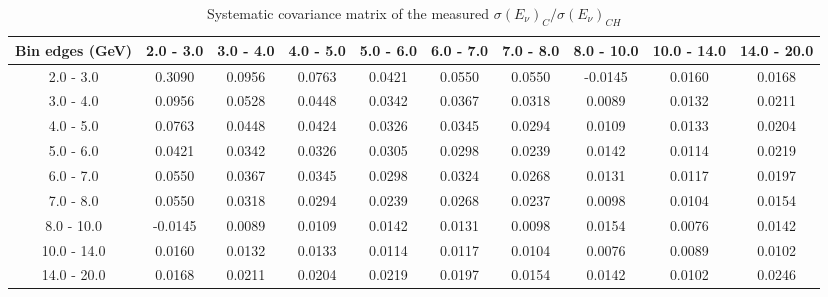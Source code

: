 \documentclass[aps,prl,twocolumn,superscriptaddress,nofootinbib]{revtex4-1}
\begin{document}
\begin{table}[h!]
  \centering
  \caption{Systematic covariance matrix of the measured $\sigma(E_{\nu})_{C}/\sigma(E_{\nu})_{CH}$}
    \begin{tabular}{c||ccccccccc}
      Bin edges (GeV) & 2.0 - 3.0 & 3.0 - 4.0 & 4.0 - 5.0 & 5.0 - 6.0 & 6.0 - 7.0 & 7.0 - 8.0 & 8.0 - 10.0 & 10.0 - 14.0 & 14.0 - 20.0 \\
\hline \hline
        2.0 - 3.0 &  0.3090 &  0.0956 &  0.0763 &  0.0421 &  0.0550 &  0.0550 & -0.0145 &  0.0160 &  0.0168 \\
        3.0 - 4.0 &  0.0956 &  0.0528 &  0.0448 &  0.0342 &  0.0367 &  0.0318 &  0.0089 &  0.0132 &  0.0211 \\
        4.0 - 5.0 &  0.0763 &  0.0448 &  0.0424 &  0.0326 &  0.0345 &  0.0294 &  0.0109 &  0.0133 &  0.0204 \\
        5.0 - 6.0 &  0.0421 &  0.0342 &  0.0326 &  0.0305 &  0.0298 &  0.0239 &  0.0142 &  0.0114 &  0.0219 \\
        6.0 - 7.0 &  0.0550 &  0.0367 &  0.0345 &  0.0298 &  0.0324 &  0.0268 &  0.0131 &  0.0117 &  0.0197 \\
        7.0 - 8.0 &  0.0550 &  0.0318 &  0.0294 &  0.0239 &  0.0268 &  0.0237 &  0.0098 &  0.0104 &  0.0154 \\
       8.0 - 10.0 & -0.0145 &  0.0089 &  0.0109 &  0.0142 &  0.0131 &  0.0098 &  0.0154 &  0.0076 &  0.0142 \\
      10.0 - 14.0 &  0.0160 &  0.0132 &  0.0133 &  0.0114 &  0.0117 &  0.0104 &  0.0076 &  0.0089 &  0.0102 \\
      14.0 - 20.0 &  0.0168 &  0.0211 &  0.0204 &  0.0219 &  0.0197 &  0.0154 &  0.0142 &  0.0102 &  0.0246 \\
    \end{tabular}
  \label{tablecov:C_Systematic_Enu}
\end{table}
\end{document}
